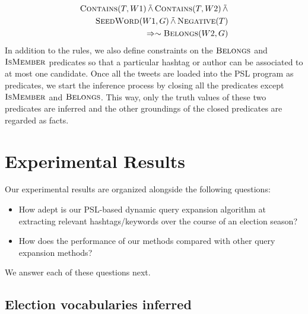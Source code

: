 \begin{align*}
\begin{split}
\textsc{Contains}(T,W1) 
	\softand \textsc{Contains}(T,W2)
	\softand \\
	 \textsc{SeedWord}(W1,G)
	\softand \textsc{Negative}(T)\\
	\Rightarrow \sim \textsc{Belongs}(W2,G)
\end{split}
\end{align*}
In addition to the rules, we also define constraints on the $\textsc{Belongs}$ and $\textsc{IsMember}$ predicates so that a particular hashtag or author can be associated to at most one candidate. 
Once all the tweets are loaded into the PSL program as predicates, we start the inference process by closing all the predicates except $\textsc{IsMember}$ and $\textsc{Belongs}$. 
This way, only the truth values of these two predicates are inferred and the other groundings of the closed predicates are regarded as facts.

\section{Experimental Results}
Our experimental results are organized alongside the following questions:
\begin{itemize}
\item How adept is our PSL-based dynamic query expansion algorithm at extracting relevant hashtags/keywords over the course
of an election season?
\item How does the performance of our methods compared with other query expansion methods?
\end{itemize}
We answer each of these questions next.

\subsection{Election vocabularies inferred}

